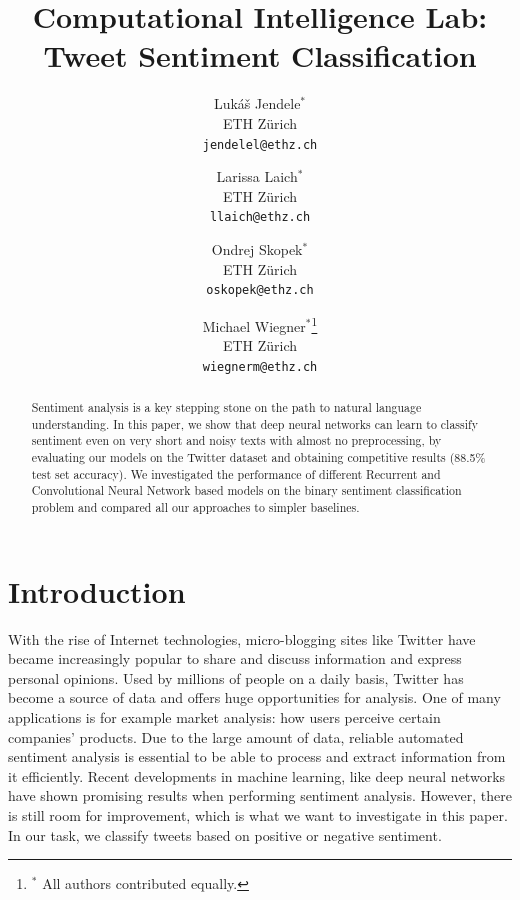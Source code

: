 \documentclass[10pt,conference,compsocconf]{IEEEtran}
\begin{document}
\title{Computational Intelligence Lab: Tweet Sentiment Classification}

\author{
  Luk\'{a}\v{s} Jendele$^\ast$\\
  ETH Z\"{u}rich\\
  \texttt{jendelel@ethz.ch}\\
  \and
  Larissa Laich$^\ast$\\
  ETH Z\"{u}rich\\
  \texttt{llaich@ethz.ch}\\
  \and
  Ondrej Skopek$^\ast$\\
  ETH Z\"{u}rich\\
  \texttt{oskopek@ethz.ch}\\
  \and
  Michael Wiegner$^\ast$\thanks{$^\ast$ All authors contributed equally.}\\
  ETH Z\"{u}rich\\
  \texttt{wiegnerm@ethz.ch}\\
}

\maketitle%

\begin{abstract}
Sentiment analysis is a key stepping stone on the path to natural language understanding. In this paper, we show that deep neural networks can learn to classify sentiment even on very short and noisy texts with almost no preprocessing, by evaluating our models on the Twitter dataset and obtaining competitive results (88.5\% test set accuracy). We investigated the performance of different Recurrent and Convolutional Neural Network based models on the binary sentiment classification problem and compared all our approaches to simpler baselines.
\end{abstract}

\section{Introduction}
With the rise of Internet technologies, micro-blogging sites like Twitter have became increasingly popular to share and discuss information and express personal opinions. Used by millions of people on a daily basis, Twitter has become a source of data and offers huge opportunities for analysis. One of many applications is for example market analysis: how users perceive certain companies' products. Due to the large amount of data, reliable automated sentiment analysis is essential to be able to process and extract information from it efficiently. Recent developments in machine learning, like deep neural networks have shown promising results when performing sentiment analysis. However, there is still room for improvement, which is what we want to investigate in this paper. In our task, we classify tweets based on positive or negative sentiment.
\end{document}
